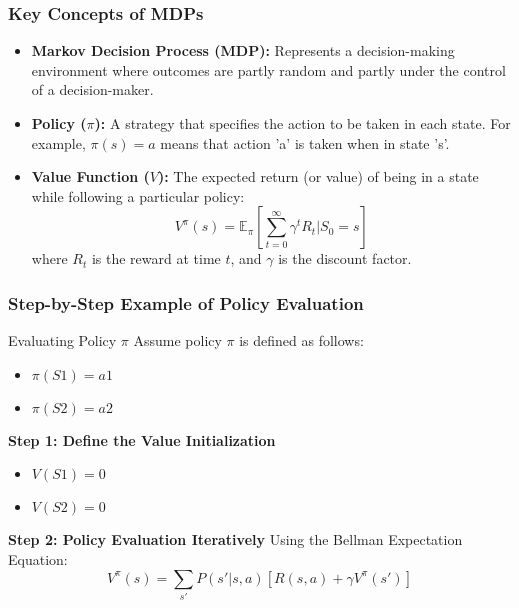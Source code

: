 \documentclass[aspectratio=169]{beamer}
\begin{document}
\begin{frame}[fragile]
    \frametitle{Key Concepts of MDPs}
    \begin{itemize}
        \item \textbf{Markov Decision Process (MDP):} 
        Represents a decision-making environment where outcomes are partly random and partly under the control of a decision-maker.
        
        \item \textbf{Policy ($\pi$):} 
        A strategy that specifies the action to be taken in each state. For example, $\pi(s) = a$ means that action 'a' is taken when in state 's'.
        
        \item \textbf{Value Function ($V$):} 
        The expected return (or value) of being in a state while following a particular policy:
        \begin{equation}
            V^{\pi}(s) = \mathbb{E}_{\pi} \left[ \sum_{t=0}^{\infty} \gamma^t R_t | S_0 = s \right]
        \end{equation}
        where $R_t$ is the reward at time $t$, and $\gamma$ is the discount factor.
    \end{itemize}
\end{frame}

\begin{frame}[fragile]
    \frametitle{Step-by-Step Example of Policy Evaluation}
    \begin{block}{Evaluating Policy $\pi$}
        Assume policy $\pi$ is defined as follows:
        \begin{itemize}
            \item $\pi(S1) = a1$
            \item $\pi(S2) = a2$
        \end{itemize}
        
        \textbf{Step 1: Define the Value Initialization}
        \begin{itemize}
            \item $V(S1) = 0$
            \item $V(S2) = 0$
        \end{itemize}
        
        \textbf{Step 2: Policy Evaluation Iteratively}
        Using the Bellman Expectation Equation:
        \begin{equation}
            V^{\pi}(s) = \sum_{s'} P(s' | s, a) [R(s, a) + \gamma V^{\pi}(s')]
        \end{equation}
    \end{block}
\end{frame}
\end{document}
